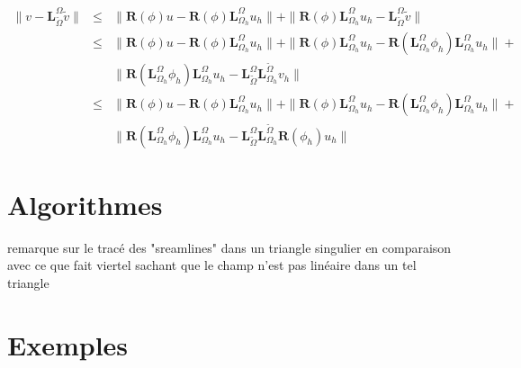 \begin{eqnarray*}
\|v-\mathbf{L}_{\widetilde{\Omega}}^\Omega\widetilde{v}\|&\leq&\|\mathbf{R}(\phi)u-\mathbf{R}(\phi)\mathbf{L}_{\Omega_h}^\Omega u_h\|+\|\mathbf{R}(\phi)\mathbf{L}_{\Omega_h}^\Omega u_h - \mathbf{L}_{\widetilde{\Omega}}^\Omega\widetilde{v}\|\\
&\leq&\|\mathbf{R}(\phi)u-\mathbf{R}(\phi)\mathbf{L}_{\Omega_h}^\Omega u_h\|+\|\mathbf{R}(\phi)\mathbf{L}_{\Omega_h}^\Omega u_h - \mathbf{R}(\mathbf{L}_{\Omega_h}^\Omega\phi_h)\mathbf{L}_{\Omega_h}^\Omega u_h\|+\\
&&\| \mathbf{R}(\mathbf{L}_{\Omega_h}^\Omega\phi_h)\mathbf{L}_{\Omega_h}^\Omega u_h - \mathbf{L}_{\widetilde{\Omega}}^\Omega\mathbf{L}_{\Omega_h}^{\widetilde{\Omega}}v_h\|\\
&\leq&\|\mathbf{R}(\phi)u-\mathbf{R}(\phi)\mathbf{L}_{\Omega_h}^\Omega u_h\|+\|\mathbf{R}(\phi)\mathbf{L}_{\Omega_h}^\Omega u_h - \mathbf{R}(\mathbf{L}_{\Omega_h}^\Omega\phi_h)\mathbf{L}_{\Omega_h}^\Omega u_h\|+\\
&&\| \mathbf{R}(\mathbf{L}_{\Omega_h}^\Omega\phi_h)\mathbf{L}_{\Omega_h}^\Omega u_h - \mathbf{L}_{\widetilde{\Omega}}^\Omega\mathbf{L}_{\Omega_h}^{\widetilde{\Omega}}\mathbf{R}(\phi_h)u_h\|
\end{eqnarray*}




\section*{Algorithmes}
\color{blue}
remarque sur le tracé des "sreamlines" dans un triangle singulier en comparaison avec ce que fait viertel sachant que le champ n'est pas linéaire dans un tel triangle
\color{black}


\section*{Exemples}

